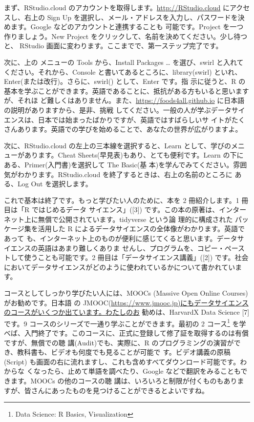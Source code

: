 \documentclass[
]{book}
\theoremstyle{definition}
\theoremstyle{definition}
\theoremstyle{definition}
\theoremstyle{definition}
\theoremstyle{remark}
\begin{document}
まず、RStudio.cloud のアカウントを取得します。\url{http://RStudio.cloud} にアクセスし、右上の Sign Up を選択し、メール・アドレスを入力し、パスワードを決めます。Google などのアカウントと連携することも 可能です。Project を一つ作りましょう。New Project をクリックして、名前を決めてください。少し待つと、 RStudio 画面に変わります。ここまでで、第一ステップ完了です。

次に、上の メニューの Tools から、Install Packages \ldots{} を選び、swirl と入れてください。それから、Console と書いてあるところに、library(swirl) といれ、Enter(または改行)。さらに、swirl() として、Enter です。指 示に従うと、R の基本を学ぶことができます。英語であることに、抵抗がある方もいると思いますが、それほ ど難しくはありません。また、\url{https://foods4all.github.io} に日本語の説明がありますから、是非、挑戦 してください。一般の人が学ぶデータサイエンスは、日本では始まったばかりですが、英語ではすばらしいサ イトがたくさんあります。英語での学びを始めることで、あなたの世界が広がりますよ。

次に、RStudio.cloud の左上の三本線を選択すると、Learn として、学びのメニューがあります。Cheat Sheets(早見表)もあり、とても便利です。Learn の下にある、Primer(入門書)を選択して The Basic(基 本)を学んでみてください。雰囲気がわかります。RStudio.cloud を終了するときは、右上の名前のところに ある、Log Out を選択します。

これで基本は終了です。もっと学びたい人のために、本を 2 冊紹介します。1 冊目は「R ではじめるデータ サイエンス」({[}3{]}) です。この本の原著は、インターネット上に無償で公開されています。tidyverse という論 理的に構成された パッケージ集を活用した R によるデータサイエンスの全体像がわかります。英語であって も、インターネット上のものが便利に感じてくると思います。データサイエンスの英語はあまり難しくありま せんし、プログラムを、コピー・ペーストして使うことも可能です。2 冊目は「データサイエンス講義」({[}2{]}) です。社会においてデータサイエンスがどのように使われているかについて書かれています。

コースとしてしっかり学びたい人には、MOOCs (Massive Open Online Courses) がお勧めです。日本語 の JMOOC(\url{https://www.jmooc.jp)にもデータサイエンスのコースがいくつか出ています。わたしのお} 勧めは、HarvardX Data Science {[}7{]} です。9 コースのシリーズで一通り学ぶことができます。最初の 2 コース\footnote{Data Science: R Basics, Visualization} を学べば、入門終了です。このコースに、正式に登録して修了証を取得するのは有償ですが、無償での聴 講(Audit)でも、実際に、R のプログラミングの演習ができ、教科書も、ビデオも何度でも見ることが可能で す。ビデオ講義の原稿 (Script) も画面の右に流れますし、これも含めすべてダウンロード可能です。わからな くなったら、止めて単語を調べたり、Google などで翻訳をみることもできます。MOOCs の他のコースの聴 講は、いろいろと制限が付くものもありますが、皆さんにあったものを見つけることができるとよいですね。
\end{document}
